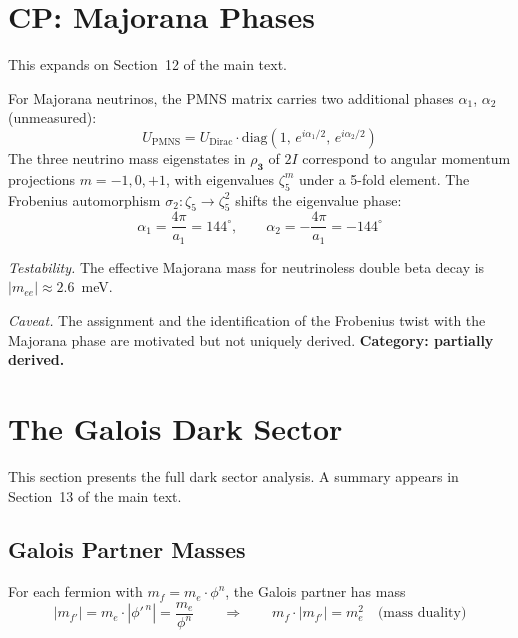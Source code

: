 \documentclass[12pt,a4paper]{article}
\theoremstyle{definition}
\begin{document}
\section{CP: Majorana Phases}
\label{sec:S-cp}

This expands on Section~12 of the main text.

For Majorana neutrinos, the PMNS matrix carries two additional phases $\alpha_1$, $\alpha_2$ (unmeasured):
\begin{equation}
U_{\text{PMNS}} = U_{\text{Dirac}} \cdot \mathrm{diag}(1,\, e^{i\alpha_1/2},\, e^{i\alpha_2/2})
\end{equation}
The three neutrino mass eigenstates in $\rho_{\mathbf{3}}$ of $2I$ correspond to angular momentum projections $m = -1, 0, +1$, with eigenvalues $\zeta_5^m$ under a 5-fold element.  The Frobenius automorphism $\sigma_2\colon \zeta_5 \to \zeta_5^2$ shifts the eigenvalue phase:
\begin{equation}
\alpha_1 = \frac{4\pi}{a_1} = 144^\circ, \qquad \alpha_2 = -\frac{4\pi}{a_1} = -144^\circ
\end{equation}

\textit{Testability.}  The effective Majorana mass for neutrinoless double beta decay is $|m_{ee}| \approx 2.6$~meV.

\textit{Caveat.}  The assignment and the identification of the Frobenius twist with the Majorana phase are motivated but not uniquely derived.  \textbf{Category: partially derived.}


\section{The Galois Dark Sector}
\label{sec:S-dark}

This section presents the full dark sector analysis.  A summary appears in Section~13 of the main text.

\subsection{Galois Partner Masses}

For each fermion with $m_f = m_e \cdot \phi^n$, the Galois partner has mass
\begin{equation}
|m_{f'}| = m_e \cdot |\phi'^{\,n}| = \frac{m_e}{\phi^n} \qquad \Longrightarrow \qquad m_f \cdot |m_{f'}| = m_e^2 \quad \text{(mass duality)}
\end{equation}
\end{document}
